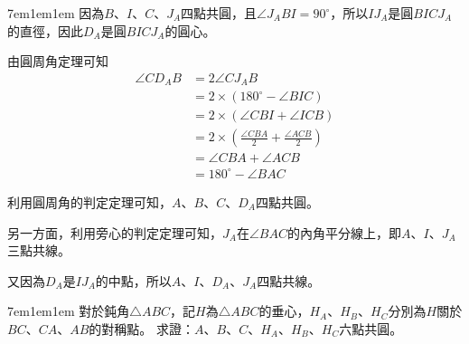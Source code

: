 \documentclass[12pt]{article}
\begin{document}
\begin{mybox}[Answer 2]{7em}{1em}{1em}
    因為$B$、$I$、$C$、$J_A$四點共圓，且$\angle{J_ABI}=90^{\circ}$，所以$IJ_A$是圓$BICJ_A$的直徑，因此$D_A$是圓$BICJ_A$的圓心。
    
    由圓周角定理可知
    \begin{align*}
        \angle{CD_AB}&=2\angle{CJ_AB}\\
        &=2\times\left(180^{\circ}-\angle{BIC}\right)\\
        &=2\times\left(\angle{CBI}+\angle{ICB}\right)\\
        &=2\times\left(\frac{\angle{CBA}}{2}+\frac{\angle{ACB}}{2}\right)\\
        &=\angle{CBA}+\angle{ACB}\\
        &=180^{\circ}-\angle{BAC}
    \end{align*}
    
    利用圓周角的判定定理可知，$A$、$B$、$C$、$D_A$四點共圓。

    另一方面，利用旁心的判定定理可知，$J_A$在$\angle{BAC}$的內角平分線上，即$A$、$I$、$J_A$三點共線。
    
    又因為$D_A$是$IJ_A$的中點，所以$A$、$I$、$D_A$、$J_A$四點共線。
\end{mybox}
\begin{mybox}[Problem 3]{7em}{1em}{1em}
    對於鈍角$\triangle{ABC}$，記$H$為$\triangle{ABC}$的垂心，$H_A$、$H_B$、$H_C$分別為$H$關於$BC$、$CA$、$AB$的對稱點。
    求證：$A$、$B$、$C$、$H_A$、$H_B$、$H_C$六點共圓。
\end{mybox}
\end{document}
